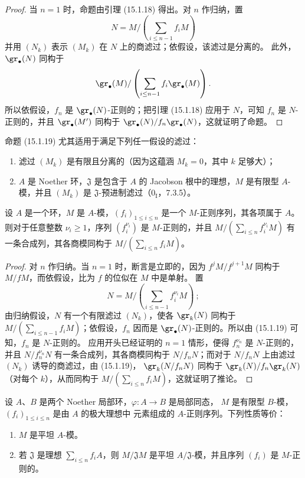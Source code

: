 \begin{proof}
当 $n=1$ 时，命题由引理 (15.1.18) 得出。对 $n$ 作归纳，置
\[
  N=M/\left(\sum_{i\leq n-1}f_iM\right)
\]
并用 $(N_k)$ 表示 $(M_k)$ 在 $N$ 上的商滤过；依假设，该滤过是分离的。
此外，$\gr_\bullet(N)$ 同构于
\[
  \gr_\bullet(M)/
  \left(\sum_{i\leq n-1}f_i\gr_\bullet(M)\right).
\]
所以依假设，$f_n$ 是 $\gr_\bullet(N)$-正则的；把引理 (15.1.18) 应用于
$N$，可知 $f_n$ 是 $N$-正则的，并且 $\gr_\bullet(M')$ 同构于
$\gr_\bullet(N)/f_n\gr_\bullet(N)$，这就证明了命题。
\end{proof}

命题 (15.1.19) 尤其适用于满足下列任一假设的滤过：
\begin{enumerate}
  \item[$1^\circ$] 滤过 $(M_k)$ 是有限且分离的（因为这蕴涵
  $M_k=0$，其中 $k$ 足够大）；
  \item[$2^\circ$] $A$ 是 Noether 环，$\mathfrak{J}$ 是包含于 $A$ 的
  Jacobson 根中的理想，$M$ 是有限型 $A$-模，并且 $(M_k)$ 是
  $\mathfrak{J}$-预进制滤过（$0_{\mathrm I}$，7.3.5）。
\end{enumerate}

\begin{corollary}[15.1.20]
\label{0.15.1.20-fr}
设 $A$ 是一个环，$M$ 是 $A$-模，$(f_i)_{1\leq i\leq n}$ 是一个
$M$-正则序列，其各项属于 $A$。则对于任意整数 $\nu_i\geq1$，序列
$(f_i^{\nu_i})$ 是 $M$-正则的，并且
$M/(\sum_{i\leq n}f_i^{\nu_i}M)$ 有一条合成列，其各商模同构于
$M/(\sum_{i\leq n}f_iM)$。
\end{corollary}

\begin{proof}
对 $n$ 作归纳。当 $n=1$ 时，断言是立即的，因为
$f^jM/f^{j+1}M$ 同构于 $M/fM$，而依假设，比为 $f$ 的位似在 $M$ 中是单射。
置
\[
  N=M/\left(\sum_{i\leq n-1}f_i^{\nu_i}M\right)~;
\]
由归纳假设，$N$ 有一个有限滤过 $(N_k)$，使各 $\gr_k(N)$ 同构于
$M/(\sum_{i\leq n-1}f_iM)$；依假设，$f_n$ 因而是
$\gr_\bullet(N)$-正则的。所以由 (15.1.19) 可知，$f_n$ 是 $N$-正则的。
应用开头已经证明的 $n=1$ 情形，便得 $f_n^{\nu_n}$ 是 $N$-正则的，并且
$N/f_n^{\nu_n}N$ 有一条合成列，其各商模同构于 $N/f_nN$；而对于
$N/f_nN$ 上由滤过 $(N_k)$ 诱导的商滤过，由 (15.1.19)，
$\gr_k(N/f_nN)$ 同构于 $\gr_k(N)/f_n\gr_k(N)$（对每个 $k$），从而同构于
$M/(\sum_{i\leq n}f_iM)$，这就证明了推论。
\end{proof}

\begin{proposition}[15.1.21]
\label{0.15.1.21-fr}
设 $A$、$B$ 是两个 Noether 局部环，$\varphi:A\to B$ 是局部同态，
$M$ 是有限型 $B$-模，$(f_i)_{1\leq i\leq n}$ 是由 $A$ 的极大理想中
元素组成的 $A$-正则序列。下列性质等价：
\begin{enumerate}
  \item[a)] $M$ 是平坦 $A$-模。
  \item[b)] 若 $\mathfrak{J}$ 是理想 $\sum_{i\leq n}f_iA$，则
  $M/\mathfrak{J}M$ 是平坦 $A/\mathfrak{J}$-模，并且序列 $(f_i)$ 是
  $M$-正则的。
\end{enumerate}
\end{proposition}

